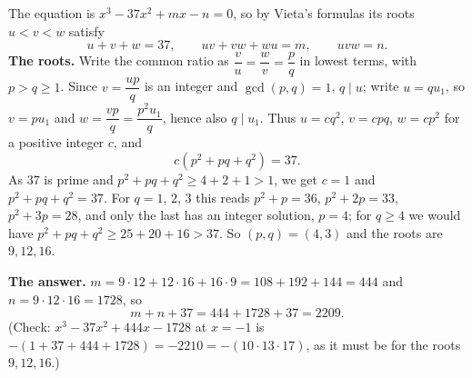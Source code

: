 The equation is $x^3-37x^2+mx-n=0$, so by Vieta's formulas its roots $u<v<w$ satisfy
\[u+v+w=37,\qquad uv+vw+wu=m,\qquad uvw=n.\]
\textbf{The roots.} Write the common ratio as $\dfrac{v}{u}=\dfrac{w}{v}=\dfrac pq$ in lowest terms, with $p>q\ge1$. Since $v=\dfrac{up}{q}$ is an integer and $\gcd(p,q)=1$, $q\mid u$; write $u=qu_1$, so $v=pu_1$ and $w=\dfrac{vp}{q}=\dfrac{p^2u_1}{q}$, hence also $q\mid u_1$. Thus $u=cq^2$, $v=cpq$, $w=cp^2$ for a positive integer $c$, and
\[c\left(p^2+pq+q^2\right)=37.\]
As $37$ is prime and $p^2+pq+q^2\ge 4+2+1>1$, we get $c=1$ and $p^2+pq+q^2=37$. For $q=1$, $2$, $3$ this reads $p^2+p=36$, $p^2+2p=33$, $p^2+3p=28$, and only the last has an integer solution, $p=4$; for $q\ge4$ we would have $p^2+pq+q^2\ge25+20+16>37$. So $(p,q)=(4,3)$ and the roots are $9,12,16$.

\textbf{The answer.} $m=9\cdot12+12\cdot16+16\cdot9=108+192+144=444$ and $n=9\cdot12\cdot16=1728$, so
\[m+n+37=444+1728+37=\boxed{2209}.\]
(Check: $x^3-37x^2+444x-1728$ at $x=-1$ is $-(1+37+444+1728)=-2210=-(10\cdot13\cdot17)$, as it must be for the roots $9,12,16$.)
